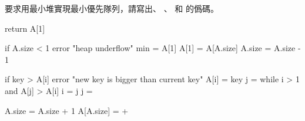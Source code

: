 \startEXERCISE
要求用最小堆實現最小優先隊列，請寫出、
、 和  的僞碼。
\stopEXERCISE

\startANSWER
{}
\startCLRSCODE
return A[1]
\stopCLRSCODE

\startCLRSCODE
if A.size < 1
	error "heap underflow"
min = A[1]
A[1] = A[A.size]
A.size = A.size - 1
\stopCLRSCODE

\startCLRSCODE
if key > A[i]
	error "new key is bigger than current key"
A[i] = key
j = 
while i > 1 and A[j] > A[i]
	i = j
	j = 
\stopCLRSCODE

\startCLRSCODE
A.size = A.size + 1
A[A.size] = +\infty
{}
\stopCLRSCODE
\stopANSWER
